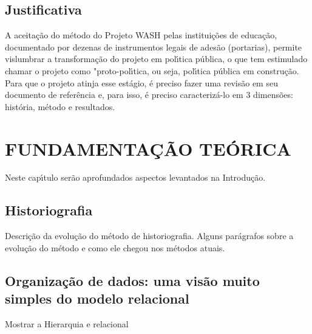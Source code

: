 \documentclass[
12pt,		%
openright,	%
twoside,  %
a4paper,			%
chapter=TITLE,		%
english,			%
french,				%
spanish,			%
brazil				%
]{USPSC-classe/USPSC}
\begin{document}
\section[Justificativa]{Justificativa}\label{Justificativa}
A aceita\c{c}\~ao do m\'etodo do Projeto WASH pelas institui\c{c}\~oes de educa\c{c}\~ao, documentado por dezenas de instrumentos legais de ades\~ao (portarias), permite vislumbrar a transforma\c{c}\~ao do projeto em pol\'{\i}tica p\'ublica, o que tem estimulado chamar o projeto como "proto-pol\'{\i}tica, ou seja, pol\'{\i}tica p\'ublica em constru\c{c}\~ao. Para que o projeto atinja esse est\'agio, \'e preciso fazer uma revis\~ao em seu documento de refer\^encia e, para isso, \'e preciso caracteriz\'a-lo em 3 dimens\~oes: hist\'oria, m\'etodo e resultados.




\chapter[FUNDAMENTA\c{C}\~AO TE\'ORICA ]{FUNDAMENTA\c{C}\~AO TE\'ORICA }\label{FUNDAMENTA\c{C}\~AO TE\'ORICA }
Neste cap\'{\i}tulo ser\~ao aprofundados aspectos levantados na Introdu\c{c}\~ao.




\section[Historiografia]{Historiografia}\label{Historiografia}
Descri\c{c}\~ao da evolu\c{c}\~ao do m\'etodo de historiografia. Alguns par\'agrafos sobre a evolu\c{c}\~ao do m\'etodo e como ele chegou nos m\'etodos atuais.




\section[Organiza\c{c}\~ao de dados: uma vis\~ao muito simples do modelo relacional]{Organiza\c{c}\~ao de dados: uma vis\~ao muito simples do modelo relacional}\label{Organiza\c{c}\~ao de dados: uma vis\~ao muito simples do modelo relacional}
Mostrar a Hierarquia e relacional
\end{document}
